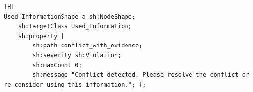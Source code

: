 \begin{lstlisting}[float,language=SHACL,caption={The SHACL shapes that detect if there is conflict. },label={SHACL_CONF_LEV}][H]
Used_InformationShape a sh:NodeShape;
	sh:targetClass Used_Information; 
	sh:property [
		sh:path conflict_with_evidence; 
		sh:severity sh:Violation; 
		sh:maxCount 0; 
		sh:message "Conflict detected. Please resolve the conflict or re-consider using this information."; ];
\end{lstlisting}